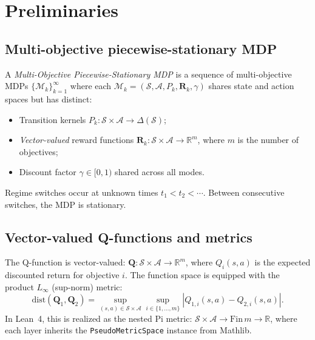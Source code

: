\section{Preliminaries}

\subsection{Multi-objective piecewise-stationary MDP}

\begin{definition}[MO-PS-MDP]
\label{def:mopsmdp}
A \emph{Multi-Objective Piecewise-Stationary MDP} is a sequence of multi-objective MDPs $\{\mathcal{M}_k\}_{k=1}^\infty$ where each $\mathcal{M}_k = (\mathcal{S}, \mathcal{A}, P_k, \mathbf{R}_k, \gamma)$ shares state and action spaces but has distinct:
\begin{itemize}
    \item Transition kernels $P_k : \mathcal{S} \times \mathcal{A} \to \Delta(\mathcal{S})$;
    \item \emph{Vector-valued} reward functions $\mathbf{R}_k : \mathcal{S} \times \mathcal{A} \to \mathbb{R}^m$, where $m$ is the number of objectives;
    \item Discount factor $\gamma \in [0, 1)$ shared across all modes.
\end{itemize}
Regime switches occur at unknown times $t_1 < t_2 < \cdots$.  Between consecutive switches, the MDP is stationary.
\end{definition}

\subsection{Vector-valued Q-functions and metrics}

The Q-function is vector-valued: $\mathbf{Q} : \mathcal{S} \times \mathcal{A} \to \mathbb{R}^m$, where $Q_i(s,a)$ is the expected discounted return for objective $i$.  The function space is equipped with the product $L_\infty$ (sup-norm) metric:
\begin{equation}
    \mathrm{dist}(\mathbf{Q}_1, \mathbf{Q}_2) = \sup_{(s,a) \in \mathcal{S} \times \mathcal{A}} \sup_{i \in \{1,\ldots,m\}} |Q_{1,i}(s,a) - Q_{2,i}(s,a)|.
    \label{eq:dist}
\end{equation}
In Lean~4, this is realized as the nested Pi metric: $\mathcal{S} \times \mathcal{A} \to \mathrm{Fin}\, m \to \mathbb{R}$, where each layer inherits the \texttt{PseudoMetricSpace} instance from Mathlib.

